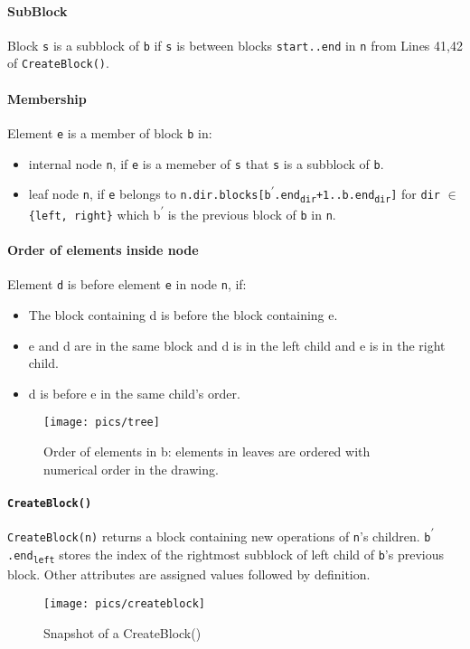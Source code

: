 \documentclass[10pt]{article}
\theoremstyle{definition}
\begin{document}
\paragraph{SubBlock} Block \texttt{s} is a subblock of \texttt{b} if \texttt{s} is between blocks \texttt{start..end} in \texttt{n} from Lines 41,42 of \texttt{CreateBlock()}.

\paragraph{Membership}
Element \texttt{e} is a member of block \texttt{b} in:
\begin{itemize}
  \item internal node \texttt{n}, if \texttt{e} is a memeber of \texttt{s} that \texttt{s} is a subblock of \texttt{b}.
  \item leaf node \texttt{n}, if \texttt{e} belongs to \texttt{n.dir.blocks[b\textsuperscript{$\prime$}.end\textsubscript{dir}+1..b.end\textsubscript{dir}]} for \texttt{dir} $\in$ \texttt{\{left, right\}} which b\textsuperscript{$\prime$} is the previous block of \texttt{b} in \texttt{n}.
\end{itemize}

\paragraph{Order of elements inside node}
Element \texttt{d} is before element \texttt{e} in node \texttt{n}, if:
\begin{itemize}
  \item The block containing d is before the block containing e.
  \item e and d are in the same block and d is in the left child and e is in the right child.
  \item d is before e in the same child's order.
\end{itemize}


\begin{figure}[hbt]
  \center\texttt{[image: pics/tree]}
  \caption{Order of elements in b: elements in leaves are ordered with numerical order in the drawing.}
\end{figure}


\paragraph{\texttt{CreateBlock()}} \texttt{CreateBlock(n)} returns a block containing new operations of \texttt{n}'s children. \texttt{b\textsuperscript{$\prime$}.end\textsubscript{left}} stores the index of the rightmost subblock of left child of \texttt{b}'s previous block. Other attributes are assigned values followed by definition.
\begin{figure}[hbt]
  \center\texttt{[image: pics/createblock]}
  \caption{\label{fig::createBlock}Snapshot of a CreateBlock()}
\end{figure}
\end{document}
